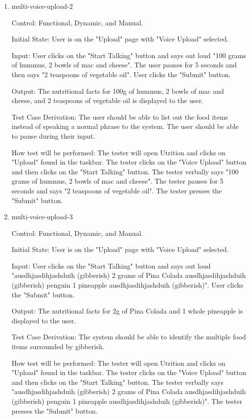 \documentclass[12pt, titlepage]{article}
\begin{document}
\begin{enumerate}
	\item{multi-voice-upload-2\\}
	
	Control: Functional, Dynamic, and Manual.
	
	Initial State: User is on the "Upload" page with "Voice Upload" selected.
	
	Input: User clicks on the "Start Talking" button and says out loud "100 grams of hummus, 2 bowls of mac and cheese". The user pauses for 5 seconds and then says "2 teaspoons of vegetable oil". User clicks the "Submit" button.
	
	Output: The nutritional facts for 100g of hummus, 2 bowls of mac and cheese, and 2 teaspoons of vegetable oil is displayed to the user.
	
	Test Case Derivation: The user should be able to list out the food items instead of speaking a normal phrase to the system. The user should be able to pause during their input.
	
	How test will be performed: The tester will open Utrition and clicks on "Upload" found in the taskbar. The tester clicks on the "Voice Upload" button and then clicks on the "Start Talking" button. The tester verbally says "100 grams of hummus, 2 bowls of mac and cheese". The tester pauses for 5 seconds and says "2 teaspoons of vegetable oil". The tester presses the "Submit" button.
	
	\item{multi-voice-upload-3\\}
	
	Control: Functional, Dynamic, and Manual.
	
	Initial State: User is on the "Upload" page with "Voice Upload" selected.
	
	Input: User clicks on the "Start Talking" button and says out loud "ausdhjasdihjashduih (gibberish) 2 grams of Pina Colada ausdhjasdihjashduih (gibberish) penguin 1 pineapple ausdhjasdihjashduih (gibberish)". User clicks the "Submit" button.
	
	Output: The nutritional facts for 2g of Pina Colada and 1 whole pineapple is displayed to the user.
	
	Test Case Derivation: The system should be able to identify the multiple food items surrounded by gibberish.
	
	How test will be performed: The tester will open Utrition and clicks on "Upload" found in the taskbar. The tester clicks on the "Voice Upload" button and then clicks on the "Start Talking" button. The tester verbally says "ausdhjasdihjashduih (gibberish) 2 grams of Pina Colada ausdhjasdihjashduih (gibberish) penguin 1 pineapple ausdhjasdihjashduih (gibberish)". The tester presses the "Submit" button.
	
\end{enumerate}
	
\end{document}
